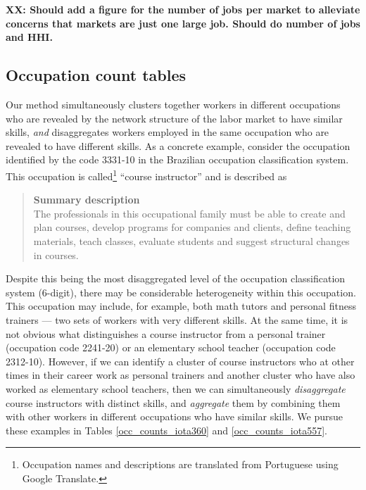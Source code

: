 \documentclass[12pt]{article}
\theoremstyle{definition}
\theoremstyle{plain}
\begin{document}
\textbf{XX: Should add a figure for the number of jobs per market to alleviate concerns that markets are just one large job. Should do number of jobs and HHI.}

\subsection{Occupation count tables}
\label{sec:occ_count_tables}

Our method simultaneously clusters together workers in different occupations who are revealed by the network structure of the labor market to have similar skills, \emph{and} disaggregates workers employed in the same occupation who are revealed to have different skills. As a concrete example, consider the occupation identified by the code 3331-10 in the Brazilian occupation classification system. This occupation is called\footnote{Occupation names and descriptions are translated from Portuguese using Google Translate.} ``course instructor'' and is described as 
\begin{quote}
	\textbf{Summary description}\\
	The professionals in this occupational family must be able to create and plan courses, develop programs for companies and clients, define teaching materials, teach classes, evaluate students and suggest structural changes in courses.
\end{quote}
Despite this being the most disaggregated level of the occupation classification system (6-digit), there may be considerable heterogeneity within this occupation. This occupation may include, for example, both math tutors and personal fitness trainers --- two sets of workers with very different skills. At the same time, it is not obvious what distinguishes a  course instructor from a personal trainer (occupation code 2241-20) or an elementary school teacher (occupation code 2312-10). However, if we can identify a cluster of course instructors who at other times in their career work as personal trainers and another cluster who have also worked as elementary school teachers, then we can simultaneously \emph{disaggregate} course instructors with distinct skills, and  \emph{aggregate} them by combining them with other workers in different occupations who have similar skills.  We pursue these examples in Tables \ref{occ_counts_iota360} and \ref{occ_counts_iota557}. 
\end{document}
